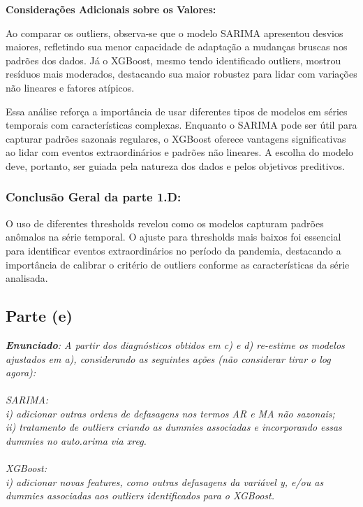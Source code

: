 \documentclass[a4paper, 12pt]{article}
\begin{document}
\textbf{Considerações Adicionais sobre os Valores:}

Ao comparar os outliers, observa-se que o modelo SARIMA apresentou desvios maiores, refletindo sua menor capacidade de adaptação a mudanças bruscas nos padrões dos dados. Já o XGBoost, mesmo tendo identificado outliers, mostrou resíduos mais moderados, destacando sua maior robustez para lidar com variações não lineares e fatores atípicos.

Essa análise reforça a importância de usar diferentes tipos de modelos em séries temporais com características complexas. Enquanto o SARIMA pode ser útil para capturar padrões sazonais regulares, o XGBoost oferece vantagens significativas ao lidar com eventos extraordinários e padrões não lineares. A escolha do modelo deve, portanto, ser guiada pela natureza dos dados e pelos objetivos preditivos.

\subsubsection{Conclusão Geral da parte 1.D:}

O uso de diferentes thresholds revelou como os modelos capturam padrões anômalos na série temporal. O ajuste para thresholds mais baixos foi essencial para identificar eventos extraordinários no período da pandemia, destacando a importância de calibrar o critério de outliers conforme as características da série analisada.



\subsection{Parte (e)}
\textit{\textbf{Enunciado}: A partir dos diagnósticos obtidos em c) e d) re-estime os modelos ajustados em a), considerando as seguintes ações (não considerar tirar o log agora):\\\\
SARIMA:\\
i) adicionar outras ordens de defasagens nos termos AR e MA não sazonais; \\
ii) tratamento de outliers criando as dummies associadas e incorporando essas
dummies no auto.arima via xreg.\\\\
XGBoost:\\
i) adicionar novas features, como outras defasagens da variável y, e/ou as dummies associadas aos outliers identificados para o XGBoost.}\\
\end{document}
